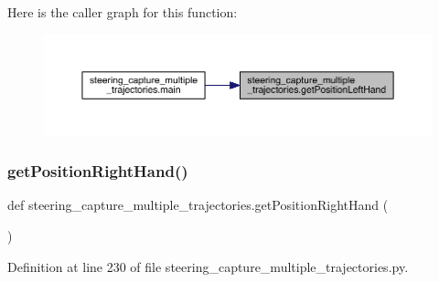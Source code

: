 Here is the caller graph for this function\+:\nopagebreak
\begin{figure}[H]
\begin{center}
\leavevmode
\includegraphics[width=350pt]{namespacesteering__capture__multiple__trajectories_a95175c2c569ebc87d8635cd5ac111f9d_icgraph}
\end{center}
\end{figure}
\mbox{\label{namespacesteering__capture__multiple__trajectories_aabe5dd4b4636c49de9d19bc3e3af0fc0}} 
\subsubsection{\texorpdfstring{getPositionRightHand()}{getPositionRightHand()}}
{\footnotesize\ttfamily def steering\+\_\+capture\+\_\+multiple\+\_\+trajectories.\+get\+Position\+Right\+Hand (\begin{DoxyParamCaption}{ }\end{DoxyParamCaption})}



Definition at line 230 of file steering\+\_\+capture\+\_\+multiple\+\_\+trajectories.\+py.


